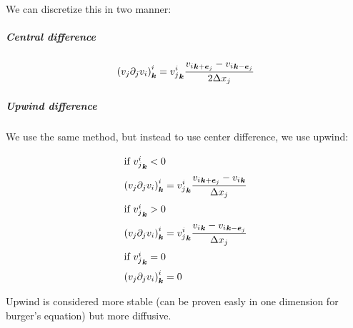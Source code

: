 We can discretize this in two manner:

\subparagraph{Central difference}
\begin{equation}
\left(v_{j}\partial_{j}v_{i}\right)^{i}_{{\boldsymbol {k}}}={v_{j}^{i}}_{{\boldsymbol {k}}}\frac{{v_{i}}_{{\boldsymbol {k}}+{\boldsymbol {e}}_j}-{v_{i}}_{{\boldsymbol {k}}-{\boldsymbol {e}}_j}}{2\Delta x_{j}}
\end{equation}

\subparagraph{Upwind difference}

We use the same method, but instead to use center difference, we use upwind:

\begin{align}
\intertext{if ${v_{j}^{i}}_{{\boldsymbol {k}}}<0$}
\left(v_{j}\partial_{j}v_{i}\right)^{i}_{{\boldsymbol {k}}}&={v_{j}^{i}}_{{\boldsymbol {k}}}\frac{{v_{i}}_{{\boldsymbol {k}}+{\boldsymbol {e}}_j}-{v_{i}}_{{\boldsymbol {k}}}}{\Delta x_{j}}\\
\intertext{if ${v_{j}^{i}}_{{\boldsymbol {k}}}>0$}
\left(v_{j}\partial_{j}v_{i}\right)^{i}_{{\boldsymbol {k}}}&={v_{j}^{i}}_{{\boldsymbol {k}}}\frac{{v_{i}}_{{\boldsymbol {k}}}-{v_{i}}_{{\boldsymbol {k}}-{\boldsymbol {e}}_j}}{\Delta x_{j}}\\
\intertext{if ${v_{j}^{i}}_{{\boldsymbol {k}}}=0$}
\left(v_{j}\partial_{j}v_{i}\right)^{i}_{{\boldsymbol {k}}}&=0
\end{align}

Upwind is considered more stable (can be proven easly in one dimension for burger's equation) but more diffusive.





